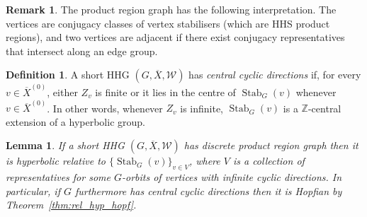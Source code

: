 \documentclass[svgnames]{amsart}
\theoremstyle{plain}
\newtheorem{lemma}[thm]{Lemma}
\theoremstyle{definition}
\newtheorem{defn}[thm]{Definition}
\newtheorem{rem}[thm]{Remark}
\newcommand{\Z}{\mathbb{Z}}
\newcommand{\ov}[1]{\overline{#1}}
\newcommand{\Stab}[2]{\operatorname{Stab}_{#1}(#2)}
\newcommand{\W}{\mathcal{W}}
\begin{document}
\begin{rem}
    The product region graph has the following interpretation. The vertices are conjugacy classes of vertex stabilisers (which are HHS product regions), and two vertices are adjacent if there exist conjugacy representatives that intersect along an edge group.
\end{rem}




\begin{defn}\label{defn:central_dir}
    A short HHG $(G, \ov X, \W)$ has \emph{central cyclic directions} if, for every $v\in\ov X^{(0)}$, either $Z_v$ is finite or it lies in the centre of $\Stab{G}{v}$ whenever $v\in\ov X^{(0)}$. In other words, whenever $Z_v$ is infinite, $\Stab{G}{v}$ is a $\Z$-central extension of a hyperbolic group.
\end{defn}



\begin{lemma}
\label{lem:rel_hyp_check}
    If a short HHG $(G, \ov X, \W)$ has discrete product region graph then it is hyperbolic relative to $\{\Stab{G}{v}\}_{v\in V}$, where $V$ is a collection of representatives for some $G$-orbits of vertices with infinite cyclic directions. In particular, if $G$ furthermore has central cyclic directions then it is Hopfian by Theorem~\ref{thm:rel_hyp_hopf}.
\end{lemma}
\end{document}
